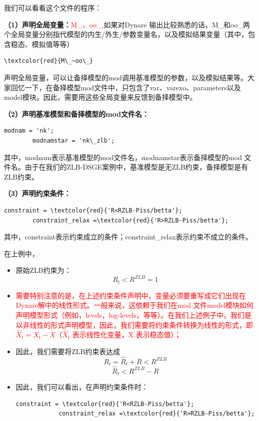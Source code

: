 \documentclass[cn,10pt,math=newtx,citestyle=gb7714-2015,bibstyle=gb7714-2015]{elegantbook}
\begin{document}
\begin{itemize}
	我们可以看看这个文件的程序：
	
	\textbf{（1）声明全局变量：}\textcolor{red}{M\_、oo\_},如果对Dynare 输出比较熟悉的话，M\_和oo\_两个全局变量分别指代模型的内生/外生/参数变量名，以及模拟结果变量（其中，包含稳态、模拟值等等）
	
	\begin{lstlisting}[frame=shadowbox]
		\textcolor{red}{M\_~oo\_}
	\end{lstlisting}
	
	声明全局变量，可以让备择模型的mod调用基准模型的参数，以及模拟结果等。大家回忆一下，在备择模型mod文件中，只包含了var、varexo、parameters以及model模块。因此，需要用这些全局变量来反馈到备择模型中。
	
	\textbf{（2）声明基准模型和备择模型的mod文件名：}
	
	\begin{lstlisting}[frame=shadowbox]
		modnam = 'nk';
		modnamstar = 'nk\_zlb';
	\end{lstlisting}
	
	其中，modnam表示基准模型的mod文件名，modnamstar表示备择模型的mod 文件名。由于在我们的ZLB-DSGE案例中，基准模型是无ZLB约束，备择模型是有ZLB约束。
	
	\textbf{（3）声明约束条件：}
	
	\begin{lstlisting}[frame=shadowbox]
		constraint = \textcolor{red}{'R<RZLB-Piss/betta'};
		constraint_relax =\textcolor{red}{'R>RZLB-Piss/betta'};
	\end{lstlisting}
	
	其中，constraint表示约束成立的条件；constraint\_relax表示约束不成立的条件。
	
	在上例中，
	\begin{itemize}
		\item 原始ZLB约束为：
		$$R_t<R^{ZLB}=1$$
		\item \textcolor{red}{需要特别注意的是，在上述约束条件声明中，变量必须要重写成它们出现在Dynare解中的线性形式。一般来说，这依赖于我们在mod 文件model模块如何声明模型形式（例如，levels，log-levels，等等）。在我们上述例子中，我们是以非线性的形式声明模型，因此，我们需要将约束条件转换为线性的形式，即$\hat{X}_t=X_t-X$（$\hat{X}_t$ 表示线性化变量，X 表示稳态值）；}
		\item 因此，我们需要将ZLB约束表达成
		$$R_t=\hat{R}_t+R<R^{ZLB}$$
		$$\hat{R}_t<R^{ZLB}-R$$
		\item 因此，我们可以看出，在声明约束条件时：
		
		\begin{lstlisting}[frame=shadowbox]
			constraint = \textcolor{red}{'R<RZLB-Piss/betta'};
			constraint_relax =\textcolor{red}{'R>RZLB-Piss/betta'};
		\end{lstlisting}
	\end{itemize}
	

\end{itemize}
\end{document}
